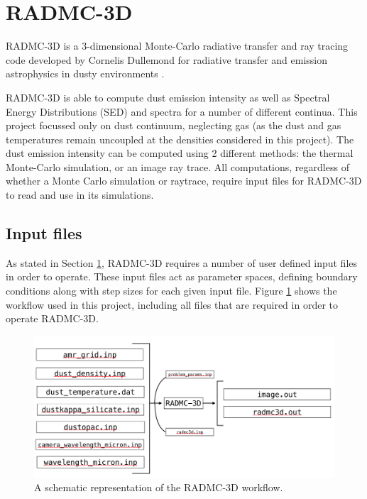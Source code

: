 \documentclass{report}
\begin{document}
\section{RADMC-3D} \label{radmc}
RADMC-3D is a 3-dimensional Monte-Carlo radiative transfer and ray tracing code developed by Cornelis Dullemond for radiative transfer and emission astrophysics in dusty environments \parencite{RADMC-3D}.

RADMC-3D is able to compute dust emission intensity as well as Spectral Energy Distributions (SED) and spectra for a number of different continua. This project focussed only on dust continuum, neglecting gas (as the dust and gas temperatures remain uncoupled at the densities considered in this project). The dust emission intensity can be computed using 2 different methods: the thermal Monte-Carlo simulation, or an image ray trace. All computations, regardless of whether a Monte Carlo simulation or raytrace, require input files for RADMC-3D to read and use in its simulations.

\subsection{Input files} \label{inp}
As stated in Section \ref{radmc}, RADMC-3D requires a number of user defined input files in order to operate. These input files act as parameter spaces, defining boundary conditions along with step sizes for each given input file. Figure \ref{fig:radmc3d-workflow} shows the workflow used in this project, including all files that are required in order to operate RADMC-3D.

\begin{figure}[h]
  \centering
  \includegraphics[scale=0.4]{../img/radmc3d-workflow}
  \caption[A schematic representation of the RADMC-3D workflow.]{A schematic representation of the RADMC-3D workflow.}
  \label{fig:radmc3d-workflow}
\end{figure}
\end{document}
